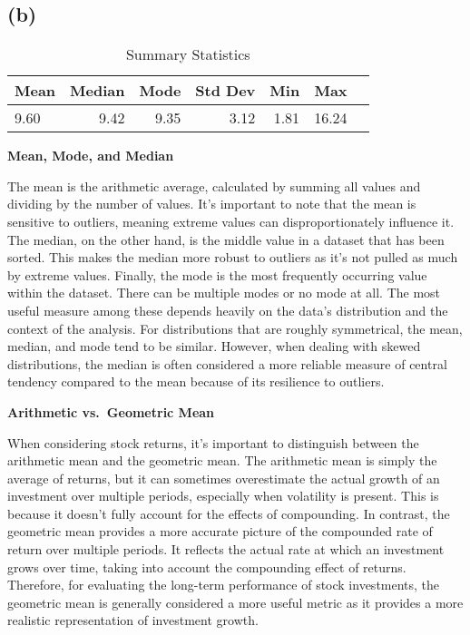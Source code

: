     \subsection{(b)}\label{b}

\begin{table}[H]
\centering
\caption{Summary Statistics}
\label{tab:summary_stats}
\begin{tabular}{lrrrrrr}
\toprule
Mean & Median & Mode & Std Dev & Min & Max \\
\midrule
9.60 & 9.42 & 9.35 & 3.12 & 1.81 & 16.24 \\
\bottomrule
\end{tabular}
\end{table}



    \textbf{Mean, Mode, and Median}

The mean is the arithmetic average, calculated by summing all values and
dividing by the number of values. It's important to note that the mean
is sensitive to outliers, meaning extreme values can disproportionately
influence it. The median, on the other hand, is the middle value in a
dataset that has been sorted. This makes the median more robust to
outliers as it's not pulled as much by extreme values. Finally, the mode
is the most frequently occurring value within the dataset. There can be
multiple modes or no mode at all. The most useful measure among these
depends heavily on the data's distribution and the context of the
analysis. For distributions that are roughly symmetrical, the mean,
median, and mode tend to be similar. However, when dealing with skewed
distributions, the median is often considered a more reliable measure of
central tendency compared to the mean because of its resilience to
outliers.

\textbf{Arithmetic vs.~Geometric Mean}

When considering stock returns, it's important to distinguish between
the arithmetic mean and the geometric mean. The arithmetic mean is
simply the average of returns, but it can sometimes overestimate the
actual growth of an investment over multiple periods, especially when
volatility is present. This is because it doesn't fully account for the
effects of compounding. In contrast, the geometric mean provides a more
accurate picture of the compounded rate of return over multiple periods.
It reflects the actual rate at which an investment grows over time,
taking into account the compounding effect of returns. Therefore, for
evaluating the long-term performance of stock investments, the geometric
mean is generally considered a more useful metric as it provides a more
realistic representation of investment growth.

